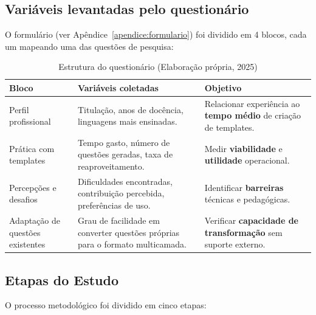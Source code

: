  
\subsection{Variáveis levantadas pelo questionário}
O formulário (ver Apêndice~\ref{apendice:formulario}) foi dividido em 4 blocos, cada um mapeando uma das questões de pesquisa:

\begin{table}[H]
    \centering
    \begin{tabular}{|p{4cm}|p{5.4cm}|p{6cm}|}
        \hline
        \textbf{Bloco} & \textbf{Variáveis coletadas} & \textbf{Objetivo} \\ \hline
        Perfil profissional & Titulação, anos de docência, linguagens mais ensinadas. & Relacionar experiência ao \textbf{tempo médio} de criação de templates. \\ \hline
        Prática com templates & Tempo gasto, número de questões geradas, taxa de reaproveitamento. & Medir \textbf{viabilidade} e \textbf{utilidade} operacional. \\ \hline
        Percepções e desafios & Dificuldades encontradas, contribuição percebida, preferências de uso. & Identificar \textbf{barreiras} técnicas e pedagógicas. \\ \hline
        Adaptação de questões existentes & Grau de facilidade em converter questões próprias para o formato multicamada. & Verificar \textbf{capacidade de transformação} sem suporte externo. \\ \hline
    \end{tabular}
    \caption{Estrutura do questionário (Elaboração própria, 2025)}
    \label{tab:questionario-objetivos}
\end{table}

\subsection*{Etapas do Estudo}
O processo metodológico foi dividido em cinco etapas:


